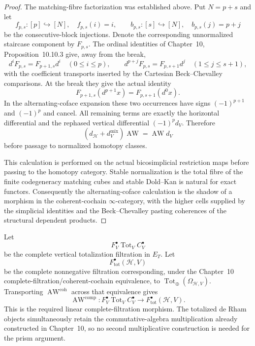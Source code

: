\begin{proof}
The matching-fibre factorization was established above.  Put $N=p+s$ and let
\[
f_{p,s}:[p]\hookrightarrow[N],\quad f_{p,s}(i)=i,
\qquad
b_{p,s}:[s]\hookrightarrow[N],\quad b_{p,s}(j)=p+j
\]
be the consecutive-block injections.  Denote the corresponding unnormalized
staircase component by $F_{p,s}$.  The ordinal identities of Chapter~10,
Proposition~10.10.3 give, away from the break,
\[
d^iF_{p,s}=F_{p+1,s}d^i\quad(0\le i\le p),
\qquad
d^{p+j}F_{p,s}=F_{p,s+1}d^j\quad(1\le j\le s+1),
\]
with the coefficient transports inserted by the Cartesian
Beck--Chevalley comparisons.  At the break they give the actual identity
\[
\boxed{
F_{p+1,s}(d^{p+1}x)
=
F_{p,s+1}(d^0x).
}
\]
In the alternating-coface expansion these two occurrences have signs
$(-1)^{p+1}$ and $(-1)^p$ and cancel.  All remaining terms are exactly the
horizontal differential and the rephased vertical differential
$(-1)^p d_V$.  Therefore
\[
(d_{\mathcal H}+d_V^{\mathrm{mix}})\operatorname{AW}
=\operatorname{AW}d_V
\]
before passage to normalized homotopy classes.

This calculation is performed on the actual bicosimplicial restriction maps
before passing to the homotopy category.  Stable normalization is the total
fibre of the finite codegeneracy matching cubes and stable Dold--Kan is natural
for exact functors.  Consequently the alternating-coface calculation is the
shadow of a morphism in the coherent-cochain $\infty$-category, with the higher
cells supplied by the simplicial identities and the Beck--Chevalley pasting
coherences of the structural dependent products.
\end{proof}

\begin{construction}
\label{constr:prequantum-complete-aw-morphism}
Let
\[
F_V^\bullet\operatorname{Tot}_VC_V^\bullet
\]
be the complete vertical totalization filtration in $E_T$.  Let
\[
F_{\mathrm{tot}}^\bullet(\mathcal H,V)
\]
be the complete nonnegative filtration corresponding, under the Chapter~10
complete-filtration/coherent-cochain equivalence, to
$\operatorname{Tot}_{\oplus}(\Omega_{\mathcal H,V})$.
Transporting $\operatorname{AW}^{\mathrm{coh}}$ across that equivalence gives
\[
\boxed{
\operatorname{AW}^{\mathrm{comp}}:
F_V^\bullet\operatorname{Tot}_VC_V^\bullet
\longrightarrow
F_{\mathrm{tot}}^\bullet(\mathcal H,V).
}
\]
This is the required linear complete-filtration morphism.  The totalized de
Rham objects simultaneously retain the commutative-algebra multiplication already
constructed in Chapter~10, so no second multiplicative construction is needed for
the prism argument.
\end{construction}

